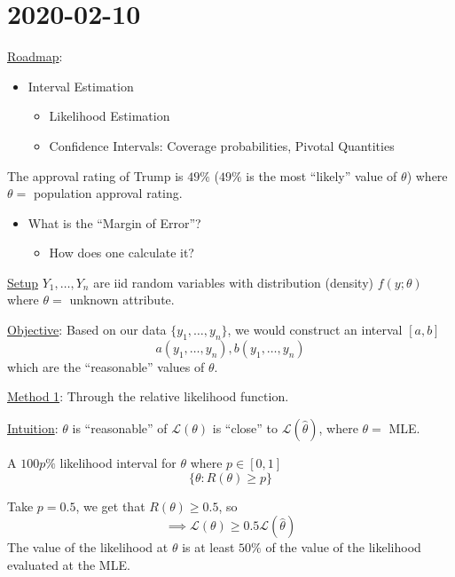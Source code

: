 \section{2020-02-10}
\underline{Roadmap}:
\begin{itemize}
    \item Interval Estimation
          \begin{itemize}
              \item Likelihood Estimation
              \item Confidence Intervals: Coverage probabilities, Pivotal Quantities
          \end{itemize}
\end{itemize}

\begin{Example}{}{}
    The approval rating of Trump is $ 49\% $ ($ 49\% $ is the most ``likely'' value of $ \theta $)
    where $ \theta= $ population approval rating.
    \begin{itemize}
        \item What is the ``Margin of Error''?
              \begin{itemize}
                  \item How does one calculate it?
              \end{itemize}
    \end{itemize}
\end{Example}

\underline{Setup} $ Y_1,\ldots ,Y_n $ are iid random variables with
distribution (density) $ f(y;\theta) $ where $ \theta= $ unknown attribute.

\underline{Objective}: Based on our data $ \{y_1,\ldots ,y_n\} $, we would
construct an interval $ [a,b] $
\[ a(y_1,\ldots ,y_n),b(y_1,\ldots ,y_n) \]
which are the ``reasonable'' values of $ \theta $.

\underline{Method 1}: Through the relative likelihood function.

\underline{Intuition}: $ \theta $ is ``reasonable'' of $ \mathcal{L}(\theta) $
is ``close'' to $ \mathcal{L}(\hat{\theta}) $, where $ \theta= $ MLE\@.


\begin{Definition}{}{}
    A $ 100p\% $ likelihood interval for $ \theta $ where $ p\in[0,1] $
    \[ \{\theta:R(\theta)\geqslant p\} \]
\end{Definition}

Take $ p=0.5 $, we get that $ R(\theta)\geqslant 0.5 $, so
\[ \implies \mathcal{L}(\theta)\geqslant 0.5 \mathcal{L}(\hat{\theta}) \]
The value of the likelihood at $ \theta $ is at least $ 50\% $ of the value of the
likelihood evaluated at the MLE\@.

